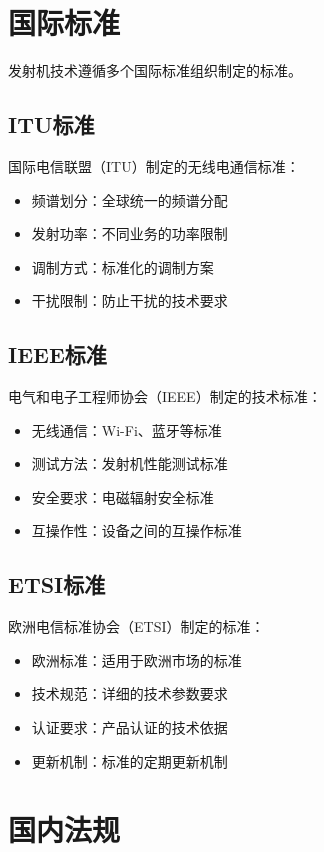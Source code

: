 \documentclass[12pt,UTF8]{ctexbook}
\begin{document}
\section{国际标准}

发射机技术遵循多个国际标准组织制定的标准。

\subsection{ITU标准}
国际电信联盟（ITU）制定的无线电通信标准：
\begin{itemize}[leftmargin=3.5em]
    \item 频谱划分：全球统一的频谱分配
    \item 发射功率：不同业务的功率限制
    \item 调制方式：标准化的调制方案
    \item 干扰限制：防止干扰的技术要求
\end{itemize}

\subsection{IEEE标准}
电气和电子工程师协会（IEEE）制定的技术标准：
\begin{itemize}[leftmargin=3.5em]
    \item 无线通信：Wi-Fi、蓝牙等标准
    \item 测试方法：发射机性能测试标准
    \item 安全要求：电磁辐射安全标准
    \item 互操作性：设备之间的互操作标准
\end{itemize}

\subsection{ETSI标准}
欧洲电信标准协会（ETSI）制定的标准：
\begin{itemize}[leftmargin=3.5em]
    \item 欧洲标准：适用于欧洲市场的标准
    \item 技术规范：详细的技术参数要求
    \item 认证要求：产品认证的技术依据
    \item 更新机制：标准的定期更新机制
\end{itemize}

\section{国内法规}
\end{document}
